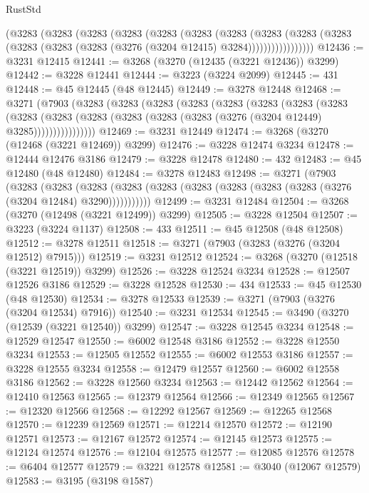 \begin{lexlean}{RustStd}
\begin{coremodule}
          (@3283
            (@3283
              (@3283
                (@3283
                  (@3283
                    (@3283
                      (@3283
                        (@3283
                          (@3283
                            (@3283 (@3283 (@3283 (@3283 (@3276 (@3204 @12415) @3284)))))))))))))))))
@12436 := @3231 @12415
@12441 := @3268 (@3270 (@12435 (@3221 @12436)) @3299)
@12442 := @3228 @12441
@12444 := @3223 (@3224 @2099)
@12445 := 431
@12448 := @45 @12445 (@48 @12445)
@12449 := @3278 @12448
@12468 := @3271
    (@7903
      (@3283
        (@3283
          (@3283
            (@3283
              (@3283
                (@3283
                  (@3283
                    (@3283
                      (@3283
                        (@3283
                          (@3283 (@3283 (@3283 (@3283 (@3276 (@3204 @12449) @3285))))))))))))))))
@12469 := @3231 @12449
@12474 := @3268 (@3270 (@12468 (@3221 @12469)) @3299)
@12476 := @3228 @12474 @3234
@12478 := @12444 @12476 @3186
@12479 := @3228 @12478
@12480 := 432
@12483 := @45 @12480 (@48 @12480)
@12484 := @3278 @12483
@12498 := @3271
    (@7903
      (@3283
        (@3283
          (@3283 (@3283 (@3283 (@3283 (@3283 (@3283 (@3283 (@3276 (@3204 @12484) @3290)))))))))))
@12499 := @3231 @12484
@12504 := @3268 (@3270 (@12498 (@3221 @12499)) @3299)
@12505 := @3228 @12504
@12507 := @3223 (@3224 @1137)
@12508 := 433
@12511 := @45 @12508 (@48 @12508)
@12512 := @3278 @12511
@12518 := @3271 (@7903 (@3283 (@3276 (@3204 @12512) @7915)))
@12519 := @3231 @12512
@12524 := @3268 (@3270 (@12518 (@3221 @12519)) @3299)
@12526 := @3228 @12524 @3234
@12528 := @12507 @12526 @3186
@12529 := @3228 @12528
@12530 := 434
@12533 := @45 @12530 (@48 @12530)
@12534 := @3278 @12533
@12539 := @3271 (@7903 (@3276 (@3204 @12534) @7916))
@12540 := @3231 @12534
@12545 := @3490 (@3270 (@12539 (@3221 @12540)) @3299)
@12547 := @3228 @12545 @3234
@12548 := @12529 @12547
@12550 := @6002 @12548 @3186
@12552 := @3228 @12550 @3234
@12553 := @12505 @12552
@12555 := @6002 @12553 @3186
@12557 := @3228 @12555 @3234
@12558 := @12479 @12557
@12560 := @6002 @12558 @3186
@12562 := @3228 @12560 @3234
@12563 := @12442 @12562
@12564 := @12410 @12563
@12565 := @12379 @12564
@12566 := @12349 @12565
@12567 := @12320 @12566
@12568 := @12292 @12567
@12569 := @12265 @12568
@12570 := @12239 @12569
@12571 := @12214 @12570
@12572 := @12190 @12571
@12573 := @12167 @12572
@12574 := @12145 @12573
@12575 := @12124 @12574
@12576 := @12104 @12575
@12577 := @12085 @12576
@12578 := @6404 @12577
@12579 := @3221 @12578
@12581 := @3040 (@12067 @12579)
@12583 := @3195 (@3198 @1587)

\end{coremodule}
\end{lexlean}
